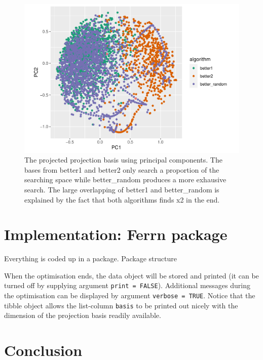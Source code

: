 \documentclass[12pt]{article}
\begin{document}
\begin{figure}
\centering
\includegraphics{paper_files/figure-latex/1d-2var-explore-proj-pca-1.pdf}
\caption{\label{1d-2var-explore-proj-pca} The projected projection basis
using principal components. The bases from better1 and better2 only
search a proportion of the searching space while better\_random produces
a more exhausive search. The large overlapping of better1 and
better\_random is explained by the fact that both algorithms finds x2 in
the end.}
\end{figure}

\hypertarget{implementation}{%
\section{Implementation: Ferrn package}\label{implementation}}

Everything is coded up in a package. Package structure

When the optimisation ends, the data object will be stored and printed
(it can be turned off by supplying argument \texttt{print\ =\ FALSE}).
Additional messages during the optimisation can be displayed by argument
\texttt{verbose\ =\ TRUE}. Notice that the tibble object allows the
list-column \texttt{basis} to be printed out nicely with the dimension
of the projection basis readily available.

\hypertarget{conclusion}{%
\section{Conclusion}\label{conclusion}}

\clearpage



\end{document}
